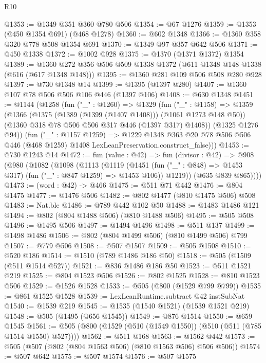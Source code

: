 \begin{lexlean}{R10}
\begin{coremodule}
@1353 := @1349 @351 @360 @780 @506
@1354 := @67 @1276
@1359 := @1353 (@450 @1354 @691) (@468 @1278)
@1360 := @602 @1348
@1366 := @1360 @358 @320 @778 @508 @1354 @691
@1370 := @1349 @97 @357 @642 @506
@1371 := @450 @1338
@1372 := @1002 @928
@1375 := @1370 (@1371 @1372) @1354
@1389 := @1360 @272 @356 @506 @509 @1338 @1372 (@611 @1348 @148 @1338 (@616 (@617 @1348 @148)))
@1395 := @1360 @281 @109 @506 @508 @280 @928
@1397 := @730 @1348 @14
@1399 := @1395 (@1397 @280)
@1407 := @1360 @107 @78 @506 @506 @106 @446 (@1397 @106)
@1408 := @630 @1348
@1451 := @1144
    (@1258
      (fun ("_" : @1260) =>
      @1329
        (fun ("_" : @1158) =>
        @1359
          (@1366
            (@1375 (@1389 (@1399 (@1407 @1408))) (@1061 @1273 @148 @50))
            (@1360 @318 @78 @506 @506 @317 @446 (@1397 @317) @1408))
          (@1325 @1276 @94))
        (fun ("_" : @1157 @1259) =>
        @1229
          @1348
          @363
          @20
          @78
          @506
          @506
          @446
          (@468 @1259)
          @1408
          LexLeanPreservation.construct_false)))
@1453 := @730 @1243 @14
@1472 := fun (value : @42) =>
  fun (divisor : @42) =>
  @908
    (@980
      (@1082
        (@1098
          (@1113
            (@1119
              (@1451 (fun ("_" : @848) => @1453 @317) (fun ("_" : @847 @1259) => @1453 @106))
              @1219))
          (@635 @839 @865))))
@1473 := (word : @42) -> @466
@1475 := @511 @71 @442
@1476 := @804 @1475
@1477 := @1476 @506
@1482 := @802 @1477 (@810 @1475 @506) @508
@1483 := Nat.ble
@1486 := @789 @442 @102 @50
@1488 := @1483 @1486 @121
@1494 := @802 (@804 @1488 @506) (@810 @1488 @506)
@1495 := @505 @508
@1496 := @1495 @506
@1497 := @1494 @1496
@1498 := @511 @137
@1499 := @1498 @1486
@1506 := @802 (@804 @1499 @506) (@810 @1499 @506) @799
@1507 := @779 @506
@1508 := @507 @1507
@1509 := @505 @1508
@1510 := @520 @186
@1514 := @1510 (@789 @1486 @186 @50)
@1518 := @505 (@1509 (@511 @1514 @527))
@1521 := @836 @1486 @186 @50
@1523 := @511 @1521 @219
@1525 := @804 @1523 @506
@1526 := @802 @1525
@1528 := @810 @1523 @506
@1529 := @1526 @1528
@1533 := @505 (@800 (@1529 @799 @799))
@1535 := @861 @1525 @1528
@1539 := LexLeanRuntime.subtract @42 instSubNat
@1540 := @1539 @219
@1545 := @1535 (@1540 @1521) (@1539 @1521 @219)
@1548 := @505 (@1495 (@656 @1545))
@1549 := @876 @1514
@1550 := @659 @1545
@1561 := @505 (@800 (@1529 (@510 (@1549 @1550)) (@510 (@511 (@785 @1514 @1550) @527))))
@1562 := @511 @168
@1563 := @1562 @442
@1573 := @505 (@507 (@802 (@804 @1563 @506) (@810 @1563 @506) @506 @506))
@1574 := @507 @642
@1575 := @507 @1574
@1576 := @507 @1575

\end{coremodule}
\end{lexlean}
